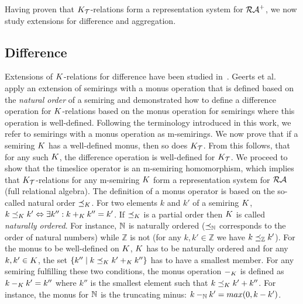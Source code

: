Having proven that
$K_{\mathcal{T}}$-relations form a representation system for $\mathcal{RA}^{+}$, we
now study extensions for %
difference and aggregation.

\subsection{Difference}
\label{sec:set-difference}

Extensions of $K$-relations for difference have been studied
in~\cite{GP10,AD11a}. 
  Geerts et al.~\cite{GP10} apply an extension of semirings with a monus
  operation that is defined based on the \textit{natural order} of a semiring
  and demonstrated how to define a difference operation for $K$-relations
  based on the monus operation for semirings where this operation is
  well-defined.
Following the terminology introduced in this work, we refer
to semirings with a monus operation as m-semirings. We now prove that
if a semiring $K$ has a well-defined monus, then so does
$K_{\mathcal{T}}$. From this follows, that for any such $K$, the
difference operation is well-defined for $K_{\mathcal{T}}$. We proceed to
show that the timeslice operator is an m-semiring homomorphism, which
implies that $K_{\mathcal{T}}$-relations for any m-semiring $K$ form a
representation system for $\mathcal{RA}$ (full relational algebra).  The
definition of a monus operator is based on the so-called natural order
$\preceq_{K}$. For two elements $k$ and $k'$ of a semiring
$K$,
$k \preceq_{K} k' \Leftrightarrow \exists k'': k +_{K} k'' =
k'$.
If $\preceq_{K}$ is a partial order then $K$ is called
\textit{naturally ordered}. For instance, ${\mathbb{N}}$ is naturally ordered
($\preceq_{{\mathbb{N}}}$ corresponds to the order of natural numbers)
while $\mathbb{Z}$ is not (for any $k,k' \in \mathbb{Z}$ we have
$k \preceq_{\mathbb{Z}} k'$). For the monus to be well-defined
on $K$, $K$ has to be naturally ordered and for any
$k, k' \in K$, the set
$\{ k'' \mid k \preceq_{K} k' +_{K} k''\}$ has to have a
smallest member. For any semiring fulfilling these two conditions, the
monus operation $-_{K}$ is defined as $k -_{K} k' = k''$ where
$k''$ is the smallest element such that
$k \preceq_{K} k' + k''$. For instance, the
monus for ${\mathbb{N}}$ is the truncating minus: $k -_{{\mathbb{N}}} k' = max(0, k - k')$.


